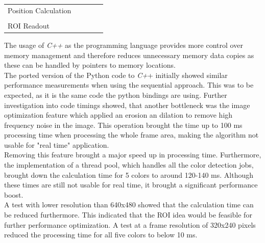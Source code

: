 \begin{table}[ht]
{\begin{tabular}{|l|l|l|l|l}
Position Calculation &                                                                             &                                                                          &                                                                                  &  \\ \cline{1-4}
                     &                                                                             &                                                                          &                                                                                  &  \\ \cline{1-4}
ROI Readout          &                                                                             &                                                                          &                                                                                  &  \\ \cline{1-4}
\end{tabular}}
\end{table} The usage of \textit{C++} as the programming language provides more control over memory management and therefore reduces unnecessary memory data copies as these can be handled by pointers to memory locations.\\
The ported version of the Python code to\textit{ C+}+ initially showed similar performance measurements when using the sequential approach. This was to be expected, as it is the same code the python bindings are using. Further investigation into code timings showed, that another bottleneck was the image optimization feature which applied an erosion an dilation to remove high frequency noise in the image. This operation brought the time up to 100 ms processing time when processing the whole frame area, making the algorithm  not usable for "real time" application. \\Removing this feature brought a major speed up in processing time. 
Furthermore, the implementation of a thread pool, which handles all the color detection jobs, brought down the calculation time for 5 colors to around 120-140 ms. Although these times are still not usable for real time, it brought a significant performance boost.\\
A test with lower resolution than 640x480 showed that the calculation time can be  reduced furthermore. This indicated that the ROI idea would be feasible for  further performance optimization. A test at a frame resolution of 320x240 pixels reduced the processing time for all five colors to below 10 ms.\\
